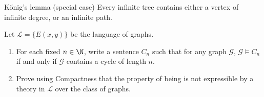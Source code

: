 \documentclass[a4paper, 12pt]{report}
\begin{document}
    \begin{framedlem}{Kőnig's lemma (special case)}
        Every infinite tree contains either a vertex of infinite degree, or an infinite path.
    \end{framedlem}

    \newpage

     Let $\mathcal L = \{E(x, y)\}$ be the language of graphs.

    \begin{enumerate}
        \item For each fixed $n \in \N$, write a sentence $C_n$ such that for any graph $\mathcal G$, $\mathcal G \models C_n$ if and only if $\mathcal G$ contains a cycle of length $n$.
        \item Prove using Compactness that the property of being  is not expressible by a theory in $\mathcal L$ over the class of graphs.
    \end{enumerate}
\end{document}
